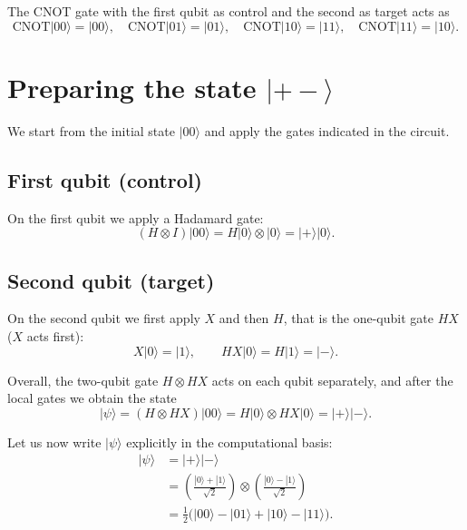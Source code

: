 \documentclass[a4paper,11pt]{article}
\providecommand{\ket}[1]{|{#1}\rangle}
\begin{document}
The CNOT gate with the first qubit as control and the second as target acts as
\begin{equation}
  \mathrm{CNOT}\ket{00} = \ket{00},\quad
  \mathrm{CNOT}\ket{01} = \ket{01},\quad
  \mathrm{CNOT}\ket{10} = \ket{11},\quad
  \mathrm{CNOT}\ket{11} = \ket{10}.
\end{equation}

\section*{Preparing the state $\ket{+ -}$}

We start from the initial state \(\ket{00}\) and apply the gates indicated in the circuit.

\subsection*{First qubit (control)}

On the first qubit we apply a Hadamard gate:
\begin{equation}
  (H \otimes I)\ket{00}
  = H\ket{0} \otimes \ket{0}
  = \ket{+}\ket{0}.
\end{equation}

\subsection*{Second qubit (target)}

On the second qubit we first apply \(X\) and then \(H\), that is the one-qubit gate \(HX\)
(\(X\) acts first):
\begin{equation}
  X\ket{0}
  = \ket{1},\qquad
  H X \ket{0}
  = H\ket{1}
  = \ket{-}.
\end{equation}

Overall, the two-qubit gate \(H \otimes HX\) acts on each qubit separately, and after the local gates we obtain the state
\begin{equation}
  \ket{\psi}
  = (H \otimes HX)\ket{00}
  = H\ket{0} \otimes HX\ket{0}
  = \ket{+}\ket{-}.
\end{equation}

Let us now write \(\ket{\psi}\) explicitly in the computational basis:
\begin{align}
  \ket{\psi}
  &= \ket{+}\ket{-} \\
  &= \left(\frac{\ket{0}+\ket{1}}{\sqrt{2}}\right)
     \otimes
     \left(\frac{\ket{0}-\ket{1}}{\sqrt{2}}\right) \\
  &= \frac{1}{2}\bigl(
        \ket{00} - \ket{01}
      + \ket{10} - \ket{11}
     \bigr).
  \label{eq:psi-explicit}
\end{align}
\end{document}
